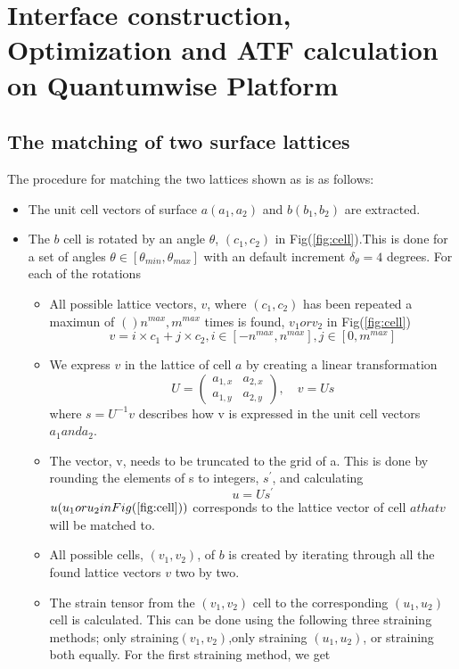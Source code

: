 \graphicspath{{Appendix2/}}
\chapter{Interface construction, Optimization and ATF calculation on Quantumwise Platform}

\section*{The matching of two surface lattices}
The procedure for matching the two lattices shown as  is as follows:
\begin{itemize}
\item The unit cell vectors of surface $a(a_1,a_2)$ and $b(b_1,b_2)$ are extracted.
\item The $b$ cell is rotated by an angle $\theta$, $(c_1,c_2)$ in
Fig(\ref{fig:cell}).This is done for a set of angles $\theta \in [\theta_{min},\theta_{max}]$ with an default increment $\delta_{\theta}=4$ degrees. For each of the rotations
\begin{itemize}
\item All possible lattice vectors, $v$, where $(c_1,c_2)$ has been repeated a maximun of $()n^{max},m^{max}$ times is found, $v_1 or v_2$ in Fig(\ref{fig:cell})
$$
v=i \times c_1 + j \times c_2,
i \in [-n^{max},n^{max}],j\in [0, m^{max}]
$$
\item We express $v$ in the lattice of cell $a$ by creating a linear transformation
$$
U=\begin{pmatrix} a_{1,x} & a_{2,x} \\ a_{1,y} & a_{2,y} \end{pmatrix},\quad v= Us
$$
where $s=U^{-1}v$ describes how v is expressed in the unit cell vectors $a_1 and a_2$.
\item The vector, v, needs to be truncated to the grid of a. This is done by rounding the elements of s to integers, $s^{'}$, and calculating 
$$
u= U s^{'}
$$
$u(u_1 or u_2 in Fig(\ref{fig:cell}))$ corresponds to the lattice vector of cell $a that v$ will be matched to.
\item All possible cells, $(v_1,v_2)$, of $b$ is created by iterating through all the found lattice vectors $v$ two by two.
\item The strain tensor from the $(v_1,v_2)$ cell to the corresponding $(u_1,u_2)$ cell is calculated. This can be done using the following three straining methods; only straining$(v_1,v_2)$,only straining $(u_1,u_2)$, or straining both equally. For the first straining method, we get

\end{itemize}
\end{itemize}
